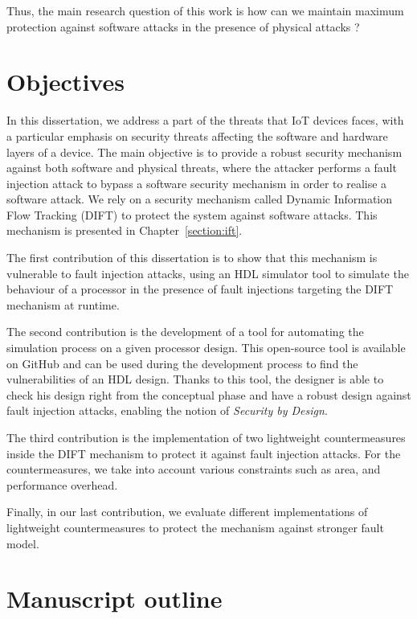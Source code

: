 Thus, the main research question of this work is how can we maintain maximum protection against software attacks in the presence of physical attacks ?

\section{Objectives}

In this dissertation, we address a part of the threats that IoT devices faces, with a particular emphasis on security threats affecting the software and hardware layers of a device. The main objective is to provide a robust security mechanism against both software and physical threats, where the attacker performs a fault injection attack to bypass a software security mechanism in order to realise a software attack.
We rely on a security mechanism called Dynamic Information Flow Tracking (DIFT) to protect the system against software attacks. This mechanism is presented in Chapter~\ref{section:ift}.

The first contribution of this dissertation is to show that this mechanism is vulnerable to fault injection attacks, using an HDL simulator tool to simulate the behaviour of a processor in the presence of fault injections targeting the DIFT mechanism at runtime.

The second contribution is the development of a tool for automating the simulation process on a given processor design. This open-source tool is available on GitHub and can be used during the development process to find the vulnerabilities of an HDL design. Thanks to this tool, the designer is able to check his design right from the conceptual phase and have a robust design against fault injection attacks, enabling the notion of \textit{Security by Design}.

The third contribution is the implementation of two lightweight countermeasures inside the DIFT mechanism to protect it against fault injection attacks. For the countermeasures, we take into account various constraints such as area, and performance overhead.

Finally, in our last contribution, we evaluate different implementations of lightweight countermeasures to protect the mechanism against stronger fault model.


\section{Manuscript outline}

